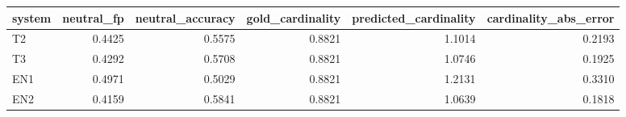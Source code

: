 \begin{tabular}{lrrrrr}
\toprule
system & neutral_fp & neutral_accuracy & gold_cardinality & predicted_cardinality & cardinality_abs_error \\
\midrule
T2 & 0.4425 & 0.5575 & 0.8821 & 1.1014 & 0.2193 \\
T3 & 0.4292 & 0.5708 & 0.8821 & 1.0746 & 0.1925 \\
EN1 & 0.4971 & 0.5029 & 0.8821 & 1.2131 & 0.3310 \\
EN2 & 0.4159 & 0.5841 & 0.8821 & 1.0639 & 0.1818 \\
\bottomrule
\end{tabular}
